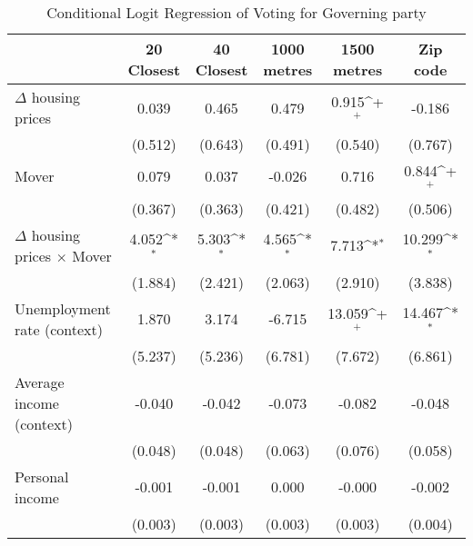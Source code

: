 \begin{table}[htbp]\centering
\def\sym#1{\ifmmode^{#1}\else\(^{#1}\)\fi}
\caption{Conditional Logit Regression of Voting for Governing party} \label{logitinter}
\begin{tabular}{l*{5}{c}}
\hline\hline
                    &\multicolumn{1}{c}{20 Closest}&\multicolumn{1}{c}{40 Closest}&\multicolumn{1}{c}{1000 metres}&\multicolumn{1}{c}{1500 metres}&\multicolumn{1}{c}{Zip code}\\
\hline
$\Delta$ housing prices&       0.039       &       0.465       &       0.479       &       0.915\sym{+}&      -0.186       \\
                    &     (0.512)       &     (0.643)       &     (0.491)       &     (0.540)       &     (0.767)       \\
[1em]
Mover               &       0.079       &       0.037       &      -0.026       &       0.716       &       0.844\sym{+}\\
                    &     (0.367)       &     (0.363)       &     (0.421)       &     (0.482)       &     (0.506)       \\
[1em]
$\Delta$ housing prices $\times$ Mover&       4.052\sym{*}&       5.303\sym{*}&       4.565\sym{*}&       7.713\sym{*}&      10.299\sym{*}\\
                    &     (1.884)       &     (2.421)       &     (2.063)       &     (2.910)       &     (3.838)       \\
[1em]
Unemployment rate (context)&       1.870       &       3.174       &      -6.715       &      13.059\sym{+}&      14.467\sym{*}\\
                    &     (5.237)       &     (5.236)       &     (6.781)       &     (7.672)       &     (6.861)       \\
[1em]
Average income (context)&      -0.040       &      -0.042       &      -0.073       &      -0.082       &      -0.048       \\
                    &     (0.048)       &     (0.048)       &     (0.063)       &     (0.076)       &     (0.058)       \\
[1em]
Personal income     &      -0.001       &      -0.001       &       0.000       &      -0.000       &      -0.002       \\
                    &     (0.003)       &     (0.003)       &     (0.003)       &     (0.003)       &     (0.004)       \\

\end{tabular}
\end{table}
